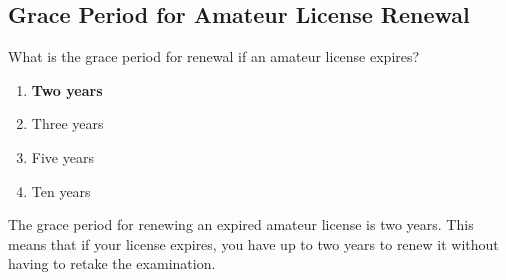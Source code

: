 \subsection{Grace Period for Amateur License Renewal}
\label{T1C09}

\begin{tcolorbox}[colback=gray!10!white,colframe=black!75!black,title=T1C09]
What is the grace period for renewal if an amateur license expires?
\begin{enumerate}[label=\Alph*),noitemsep]
    \item \textbf{Two years}
    \item Three years
    \item Five years
    \item Ten years
\end{enumerate}
\end{tcolorbox}

The grace period for renewing an expired amateur license is two years. This means that if your license expires, you have up to two years to renew it without having to retake the examination.